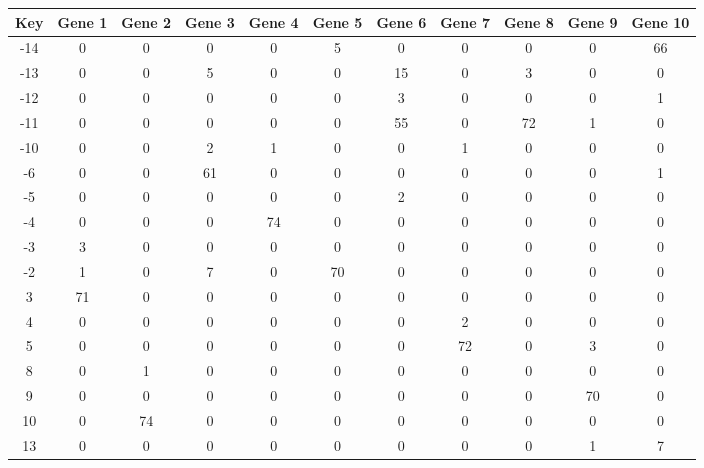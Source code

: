\begin{tabular}{|c|c|c|c|c|c|c|c|c|c|c|}
\hline
Key & Gene 1 & Gene 2 & Gene 3 & Gene 4 & Gene 5 & Gene 6 & Gene 7 & Gene 8 & Gene 9 & Gene 10 \\
\hline
-14 & 0 & 0 & 0 & 0 & 5 & 0 & 0 & 0 & 0 & 66 \\
-13 & 0 & 0 & 5 & 0 & 0 & 15 & 0 & 3 & 0 & 0 \\
-12 & 0 & 0 & 0 & 0 & 0 & 3 & 0 & 0 & 0 & 1 \\
-11 & 0 & 0 & 0 & 0 & 0 & 55 & 0 & 72 & 1 & 0 \\
-10 & 0 & 0 & 2 & 1 & 0 & 0 & 1 & 0 & 0 & 0 \\
-6 & 0 & 0 & 61 & 0 & 0 & 0 & 0 & 0 & 0 & 1 \\
-5 & 0 & 0 & 0 & 0 & 0 & 2 & 0 & 0 & 0 & 0 \\
-4 & 0 & 0 & 0 & 74 & 0 & 0 & 0 & 0 & 0 & 0 \\
-3 & 3 & 0 & 0 & 0 & 0 & 0 & 0 & 0 & 0 & 0 \\
-2 & 1 & 0 & 7 & 0 & 70 & 0 & 0 & 0 & 0 & 0 \\
3 & 71 & 0 & 0 & 0 & 0 & 0 & 0 & 0 & 0 & 0 \\
4 & 0 & 0 & 0 & 0 & 0 & 0 & 2 & 0 & 0 & 0 \\
5 & 0 & 0 & 0 & 0 & 0 & 0 & 72 & 0 & 3 & 0 \\
8 & 0 & 1 & 0 & 0 & 0 & 0 & 0 & 0 & 0 & 0 \\
9 & 0 & 0 & 0 & 0 & 0 & 0 & 0 & 0 & 70 & 0 \\
10 & 0 & 74 & 0 & 0 & 0 & 0 & 0 & 0 & 0 & 0 \\
13 & 0 & 0 & 0 & 0 & 0 & 0 & 0 & 0 & 1 & 7 \\
\hline
\end{tabular}